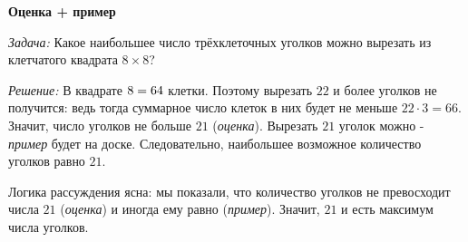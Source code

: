 \documentclass{article}
\begin{document}
\large


\begin{center}
\textbf{Оценка + пример}
\end{center}

\textit{Задача:} Какое наибольшее число трёхклеточных уголков можно вырезать из клетчатого квадрата $8 \times 8$?

\textit{Решение:} В квадрате $8 \time 8=64$ клетки. Поэтому вырезать $22$ и более уголков не получится: ведь тогда суммарное число клеток в них будет не меньше $22\cdot 3 = 66$. Значит, число уголков не больше $21$ (\textit{оценка}).
Вырезать $21$ уголок можно - \textit{пример} будет на доске. Следовательно, наибольшее возможное количество уголков равно $21$.

Логика рассуждения ясна: мы показали, что количество уголков не превосходит числа $21$
(\textit{оценка}) и иногда ему равно (\textit{пример}). Значит, $21$ и есть максимум числа уголков.
\end{document}
